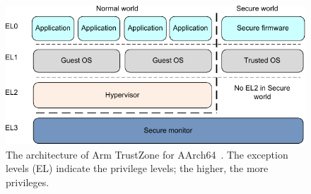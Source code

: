 \begin{figure}[htpb]
  \centering
  \includegraphics[width=0.8\linewidth]{figures/arm-trustzone-arch.pdf}
  \caption{The architecture of Arm TrustZone for AArch64~\cite{TZArch}. The exception levels (EL) indicate the privilege levels; the higher, the more privileges.}\label{fig:arm_trustzone_arch}
\end{figure}
